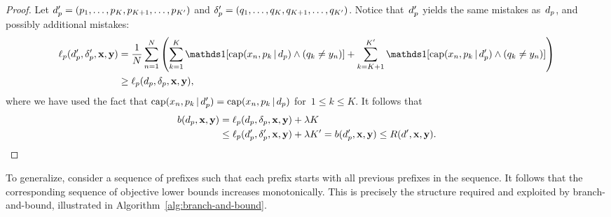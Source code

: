 \begin{proof}
Let ${d_p' = (p_1, \dots, p_K, p_{K+1}, \dots, p_{K'})}$
and ${\delta_p' = (q_1, \dots, q_K, q_{K+1}, \dots, q_{K'})}$.
%
Notice that~$d_p'$ yields the same mistakes as~$d_p$,
and possibly additional mistakes:
\begin{align}
\Loss_p(\Prefix', \Labels', \x, \y)
&= \frac{1}{N} \sum_{n=1}^N \left( \sum_{k=1}^K \one [ \Cap(x_n, p_k \given \Prefix) \wedge (q_k \neq y_n) ]
+ \sum_{k=K+1}^{K'} \one [ \Cap(x_n, p_k \given \Prefix') \wedge (q_k \neq y_n) ] \right) \nn \\
&\ge \Loss_p(\Prefix, \Labels, \x, \y),
\label{eq:prefix-loss}
\end{align}
where we have used the fact that
${\textnormal{cap}(x_n, p_k \,|\, d_p') = \textnormal{cap}(x_n, p_k \,|\, d_p)}$
for~${1 \le k \le K}$.
%
It follows that
\begin{align}
b(\Prefix, \x, \y) &= \Loss_p(\Prefix, \Labels, \x, \y) + \Reg K \nn \\
&\le  \Loss_p(\Prefix', \Labels', \x, \y) + \Reg K' = b(\Prefix', \x, \y)
\le \Obj(\RL', \x, \y).
\label{eq:prefix-lb}
\end{align}
\end{proof}

To generalize, consider a sequence of prefixes such that each prefix
starts with all previous prefixes in the sequence.
%
It follows that the corresponding sequence of objective lower bounds
increases monotonically.
%
This is precisely the structure required and exploited by branch-and-bound,
illustrated in Algorithm~\ref{alg:branch-and-bound}.

